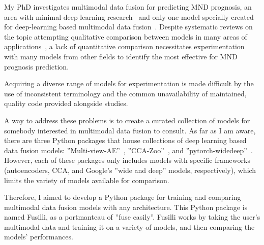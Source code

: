 My PhD investigates multimodal data fusion for predicting MND prognosis, an area with minimal deep learning research~\cite{pancottiDeepLearningMethods2022, mullerExplainableModelsDisease2021} and only one model specially created for deep-learning based multimodal data fusion~\cite{vanderburghDeepLearningPredictions2017}.
Despite systematic reviews on the topic attempting qualitative comparison between models in many areas of applications~\cite{cuiDeepMultimodalFusion2022, gaoSurveyDeepLearning2020, stahlschmidtMultimodalDeepLearning2022, yanDeepMultiviewLearning2021}, a lack of quantitative comparison necessitates experimentation with many models from other fields to identify the most effective for MND prognosis prediction.

Acquiring a diverse range of models for experimentation is made difficult by the use of inconsistent terminology and the common unavailability of maintained, quality code provided alongside studies.

A way to address these problems is to create a curated collection of models for somebody interested in multimodal data fusion to consult.
As far as I am aware, there are three Python packages that house collections of deep learning based data fusion models: ''Multi-view-AE''~\cite{aguilaMultiviewAEPythonPackage2023}, ''CCA-Zoo''~\cite{chapmanCCAZooCollectionRegularized2021}, and ''pytorch-widedeep''~\cite{zaurinPytorchwidedeepFlexiblePackage2023}.
However, each of these packages only includes models with specific frameworks (autoencoders, CCA, and Google's ''wide and deep'' models, respectively), which limits the variety of models available for comparison.

Therefore, I aimed to develop a Python package for training and comparing multimodal data fusion models with any architecture.
This Python package is named Fusilli, as a portmanteau of ''fuse easily''.
Fusilli works by taking the user's multimodal data and training it on a variety of models, and then comparing the models' performances.

